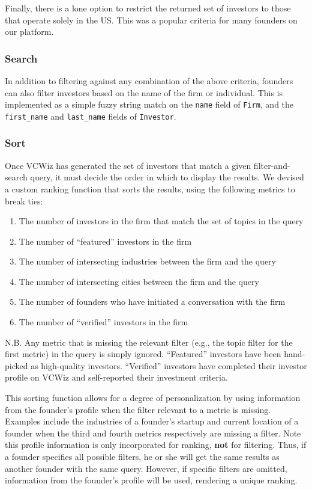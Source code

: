 Finally, there is a lone option to restrict the returned set of investors to those that operate solely in the US. This was a popular criteria for many founders on our platform.

\subsubsection{Search}

In addition to filtering against any combination of the above criteria, founders can also filter investors based on the name of the firm or individual. This is implemented as a simple fuzzy string match on the \texttt{name} field of \texttt{Firm}, and the \texttt{first\_name} and \texttt{last\_name} fields of \texttt{Investor}.

\subsubsection{Sort}

Once VCWiz has generated the set of investors that match a given filter-and-search query, it must decide the order in which to display the results. We devised a custom ranking function that sorts the results, using the following metrics to break ties:

\begin{enumerate}
  \item The number of investors in the firm that match the set of topics in the query
  \item The number of ``featured'' investors in the firm
  \item The number of intersecting industries between the firm and the query
  \item The number of intersecting cities between the firm and the query
  \item The number of founders who have initiated a conversation with the firm
  \item The number of ``verified'' investors in the firm
\end{enumerate}

N.B. Any metric that is missing the relevant filter (e.g., the topic filter for the first metric) in the query is simply ignored. ``Featured'' investors have been hand-picked as high-quality investors. ``Verified'' investors have completed their investor profile on VCWiz and self-reported their investment criteria.

This sorting function allows for a degree of personalization by using information from the founder's profile when the filter relevant to a metric is missing. Examples include the industries of a founder's startup and current location of a founder when the third and fourth metrics respectively are missing a filter. Note this profile information is only incorporated for ranking, \textbf{not} for filtering. Thus, if a founder specifies all possible filters, he or she will get the same results as another founder with the same query. However, if specific filters are omitted, information from the founder's profile will be used, rendering a unique ranking.

